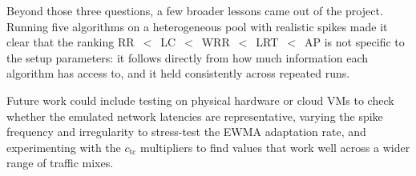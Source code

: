 \documentclass[10pt,a4paper,twocolumn]{article}
\numberwithin{figure}{section}
\numberwithin{table}{section}
\numberwithin{equation}{section}
\begin{document}
Beyond those three questions, a few broader lessons came out of the project.
Running five algorithms on a heterogeneous pool with realistic spikes made it
clear that the ranking RR~$<$~LC~$<$~WRR~$<$~LRT~$<$~AP is not specific to the
setup parameters: it follows directly from how much information each algorithm
has access to, and it held consistently across repeated runs.

Future work could include testing on physical hardware or cloud VMs to check
whether the emulated network latencies are representative, varying the spike
frequency and irregularity to stress-test the EWMA adaptation rate, and
experimenting with the $c_{\mathrm{tc}}$ multipliers to find values that work
well across a wider range of traffic mixes.


\end{document}
